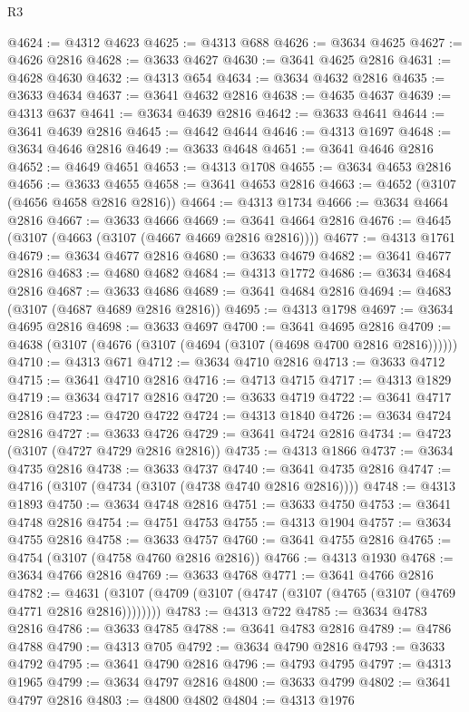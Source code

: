 \begin{lexlean}{R3}
\begin{coremodule}
@4624 := @4312 @4623
@4625 := @4313 @688
@4626 := @3634 @4625
@4627 := @4626 @2816
@4628 := @3633 @4627
@4630 := @3641 @4625 @2816
@4631 := @4628 @4630
@4632 := @4313 @654
@4634 := @3634 @4632 @2816
@4635 := @3633 @4634
@4637 := @3641 @4632 @2816
@4638 := @4635 @4637
@4639 := @4313 @637
@4641 := @3634 @4639 @2816
@4642 := @3633 @4641
@4644 := @3641 @4639 @2816
@4645 := @4642 @4644
@4646 := @4313 @1697
@4648 := @3634 @4646 @2816
@4649 := @3633 @4648
@4651 := @3641 @4646 @2816
@4652 := @4649 @4651
@4653 := @4313 @1708
@4655 := @3634 @4653 @2816
@4656 := @3633 @4655
@4658 := @3641 @4653 @2816
@4663 := @4652 (@3107 (@4656 @4658 @2816 @2816))
@4664 := @4313 @1734
@4666 := @3634 @4664 @2816
@4667 := @3633 @4666
@4669 := @3641 @4664 @2816
@4676 := @4645 (@3107 (@4663 (@3107 (@4667 @4669 @2816 @2816))))
@4677 := @4313 @1761
@4679 := @3634 @4677 @2816
@4680 := @3633 @4679
@4682 := @3641 @4677 @2816
@4683 := @4680 @4682
@4684 := @4313 @1772
@4686 := @3634 @4684 @2816
@4687 := @3633 @4686
@4689 := @3641 @4684 @2816
@4694 := @4683 (@3107 (@4687 @4689 @2816 @2816))
@4695 := @4313 @1798
@4697 := @3634 @4695 @2816
@4698 := @3633 @4697
@4700 := @3641 @4695 @2816
@4709 := @4638 (@3107 (@4676 (@3107 (@4694 (@3107 (@4698 @4700 @2816 @2816))))))
@4710 := @4313 @671
@4712 := @3634 @4710 @2816
@4713 := @3633 @4712
@4715 := @3641 @4710 @2816
@4716 := @4713 @4715
@4717 := @4313 @1829
@4719 := @3634 @4717 @2816
@4720 := @3633 @4719
@4722 := @3641 @4717 @2816
@4723 := @4720 @4722
@4724 := @4313 @1840
@4726 := @3634 @4724 @2816
@4727 := @3633 @4726
@4729 := @3641 @4724 @2816
@4734 := @4723 (@3107 (@4727 @4729 @2816 @2816))
@4735 := @4313 @1866
@4737 := @3634 @4735 @2816
@4738 := @3633 @4737
@4740 := @3641 @4735 @2816
@4747 := @4716 (@3107 (@4734 (@3107 (@4738 @4740 @2816 @2816))))
@4748 := @4313 @1893
@4750 := @3634 @4748 @2816
@4751 := @3633 @4750
@4753 := @3641 @4748 @2816
@4754 := @4751 @4753
@4755 := @4313 @1904
@4757 := @3634 @4755 @2816
@4758 := @3633 @4757
@4760 := @3641 @4755 @2816
@4765 := @4754 (@3107 (@4758 @4760 @2816 @2816))
@4766 := @4313 @1930
@4768 := @3634 @4766 @2816
@4769 := @3633 @4768
@4771 := @3641 @4766 @2816
@4782 := @4631 (@3107 (@4709 (@3107 (@4747 (@3107 (@4765 (@3107 (@4769 @4771 @2816 @2816))))))))
@4783 := @4313 @722
@4785 := @3634 @4783 @2816
@4786 := @3633 @4785
@4788 := @3641 @4783 @2816
@4789 := @4786 @4788
@4790 := @4313 @705
@4792 := @3634 @4790 @2816
@4793 := @3633 @4792
@4795 := @3641 @4790 @2816
@4796 := @4793 @4795
@4797 := @4313 @1965
@4799 := @3634 @4797 @2816
@4800 := @3633 @4799
@4802 := @3641 @4797 @2816
@4803 := @4800 @4802
@4804 := @4313 @1976

\end{coremodule}
\end{lexlean}
